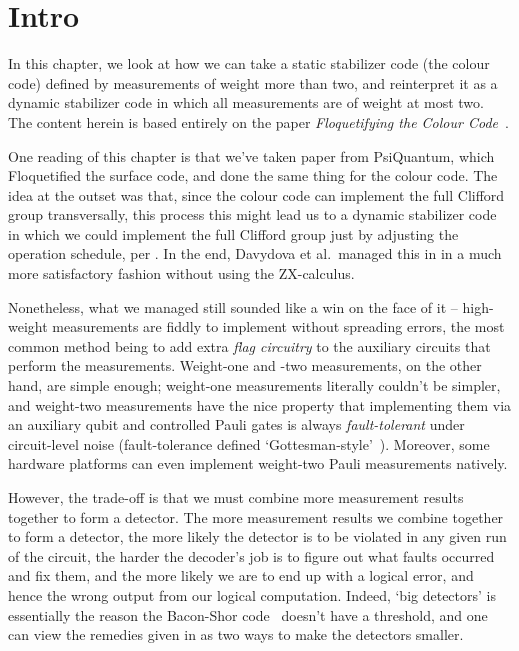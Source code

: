 \section{Intro}

In this chapter, we look at how we can take a static stabilizer code (the colour code) defined by measurements of weight more than two, and reinterpret it as a dynamic stabilizer code in which all measurements are of weight at most two.
The content herein is based entirely on the paper \textit{Floquetifying the Colour Code}~\cite{Townsend_Teague_2023}.

One reading of this chapter is that we've taken paper  from PsiQuantum, which Floquetified the surface code, and done the same thing for the colour code.
The idea at the outset was that, since the colour code can implement the full Clifford group transversally, this process this might lead us to a dynamic stabilizer code in which we could implement the full Clifford group just by adjusting the operation schedule, per .
In the end, Davydova et al.\ managed this in  in a much more satisfactory fashion without using the ZX-calculus.

Nonetheless, what we managed still sounded like a win on the face of it -- high-weight measurements are fiddly to implement without spreading errors, the most common method being to add extra \textit{flag circuitry} to the auxiliary circuits that perform the measurements.
Weight-one and -two measurements, on the other hand, are simple enough; weight-one measurements literally couldn't be simpler, and weight-two measurements have the nice property that implementing them via an auxiliary qubit and controlled Pauli gates is always \textit{fault-tolerant} under circuit-level noise (fault-tolerance defined `Gottesman-style'~\cite{gottesman2024surviving}).
Moreover, some hardware platforms can even implement weight-two Pauli measurements natively.

However, the trade-off is that we must combine more measurement results together to form a detector.
The more measurement results we combine together to form a detector, the more likely the detector is to be violated in any given run of the circuit, the harder the decoder's job is to figure out what faults occurred and fix them, and the more likely we are to end up with a logical error, and hence the wrong output from our logical computation.
Indeed, `big detectors' is essentially the reason the Bacon-Shor code~\cite{Shor1995BaconShor,Bacon_2006} doesn't have a threshold, and one can view the remedies given in  as two ways to make the detectors smaller.

